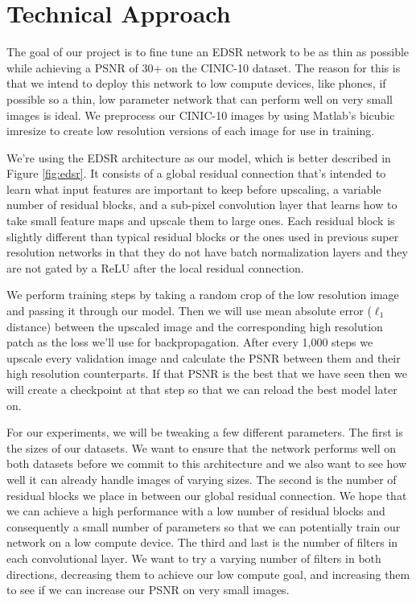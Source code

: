 \documentclass[conference]{IEEEtran}
\begin{document}
\section{Technical Approach}
The goal of our project is to fine tune an EDSR network to be as thin as possible while achieving a PSNR of 30+ on the CINIC-10 dataset.
The reason for this is that we intend to deploy this network to low compute devices, like phones, if possible so a thin, low parameter network that can perform well on very small images is ideal.
We preprocess our CINIC-10 images by using Matlab's bicubic imresize to create low resolution versions of each image for use in training.

We're using the EDSR architecture as our model, which is better described in Figure \ref{fig:edsr}.
It consists of a global residual connection that's intended to learn what input features are important to keep before upscaling, a variable number of residual blocks, and a sub-pixel convolution layer that learns how to take small feature maps and upscale them to large ones.
Each residual block is slightly different than typical residual blocks or the ones used in previous super resolution networks in that they do not have batch normalization layers and they are not gated by a ReLU after the local residual connection.

We perform training steps by taking a random crop of the low resolution image and passing it through our model.
Then we will use mean absolute error ($\ell_1$ distance) between the upscaled image and the corresponding high resolution patch as the loss we'll use for backpropagation.
After every 1,000 steps we upscale every validation image and calculate the PSNR between them and their high resolution counterparts.
If that PSNR is the best that we have seen then we will create a checkpoint at that step so that we can reload the best model later on.

For our experiments, we will be tweaking a few different parameters.
The first is the sizes of our datasets.
We want to ensure that the network performs well on both datasets before we commit to this architecture and we also want to see how well it can already handle images of varying sizes.
The second is the number of residual blocks we place in between our global residual connection.
We hope that we can achieve a high performance with a low number of residual blocks and consequently a small number of parameters so that we can potentially train our network on a low compute device.
The third and last is the number of filters in each convolutional layer.
We want to try a varying number of filters in both directions, decreasing them to achieve our low compute goal, and increasing them to see if we can increase our PSNR on very small images.
\end{document}
